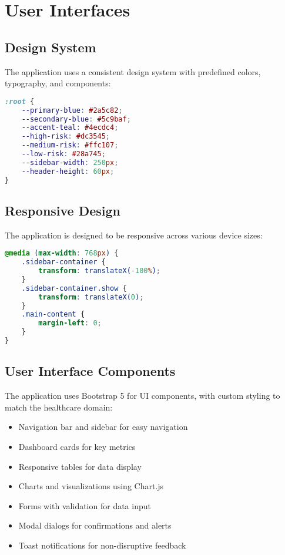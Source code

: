 \documentclass[12pt,a4paper]{report}
\begin{document}
\chapter{User Interfaces}

\section{Design System}
The application uses a consistent design system with predefined colors, typography, and components:

\begin{lstlisting}[language=CSS]
:root {
    --primary-blue: #2a5c82;
    --secondary-blue: #5c9baf;
    --accent-teal: #4ecdc4;
    --high-risk: #dc3545;
    --medium-risk: #ffc107;
    --low-risk: #28a745;
    --sidebar-width: 250px;
    --header-height: 60px;
}
\end{lstlisting}

\section{Responsive Design}
The application is designed to be responsive across various device sizes:

\begin{lstlisting}[language=CSS]
@media (max-width: 768px) {
    .sidebar-container {
        transform: translateX(-100%);
    }
    .sidebar-container.show {
        transform: translateX(0);
    }
    .main-content {
        margin-left: 0;
    }
}
\end{lstlisting}

\section{User Interface Components}
The application uses Bootstrap 5 for UI components, with custom styling to match the healthcare domain:

\begin{itemize}
    \item Navigation bar and sidebar for easy navigation
    \item Dashboard cards for key metrics
    \item Responsive tables for data display
    \item Charts and visualizations using Chart.js
    \item Forms with validation for data input
    \item Modal dialogs for confirmations and alerts
    \item Toast notifications for non-disruptive feedback
\end{itemize}
\end{document}
